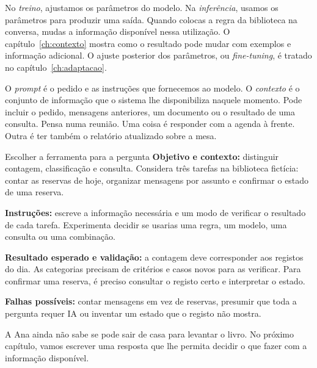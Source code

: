 No \emph{treino}, ajustamos os parâmetros do modelo. Na \emph{inferência}, usamos os parâmetros para produzir uma saída. Quando colocas a regra da biblioteca na conversa, mudas a informação disponível nessa utilização. O capítulo~\ref{ch:contexto} mostra como o resultado pode mudar com exemplos e informação adicional. O ajuste posterior dos parâmetros, ou \emph{fine-tuning}, é tratado no capítulo~\ref{ch:adaptacao}.

O \emph{prompt} é o pedido e as instruções que fornecemos ao modelo. O \emph{contexto} é o conjunto de informação que o sistema lhe disponibiliza naquele momento. Pode incluir o pedido, mensagens anteriores, um documento ou o resultado de uma consulta. Pensa numa reunião. Uma coisa é responder com a agenda à frente. Outra é ter também o relatório atualizado sobre a mesa.

\begin{promptlabbox}{Escolher a ferramenta para a pergunta}
\textbf{Objetivo e contexto:} distinguir contagem, classificação e consulta. Considera três tarefas na biblioteca fictícia: contar as reservas de hoje, organizar mensagens por assunto e confirmar o estado de uma reserva.

\textbf{Instruções:} escreve a informação necessária e um modo de verificar o resultado de cada tarefa. Experimenta decidir se usarias uma regra, um modelo, uma consulta ou uma combinação.

\textbf{Resultado esperado e validação:} a contagem deve corresponder aos registos do dia. As categorias precisam de critérios e casos novos para as verificar. Para confirmar uma reserva, é preciso consultar o registo certo e interpretar o estado.

\textbf{Falhas possíveis:} contar mensagens em vez de reservas, presumir que toda a pergunta requer IA ou inventar um estado que o registo não mostra.
\end{promptlabbox}

A Ana ainda não sabe se pode sair de casa para levantar o livro. No próximo capítulo, vamos escrever uma resposta que lhe permita decidir o que fazer com a informação disponível.
